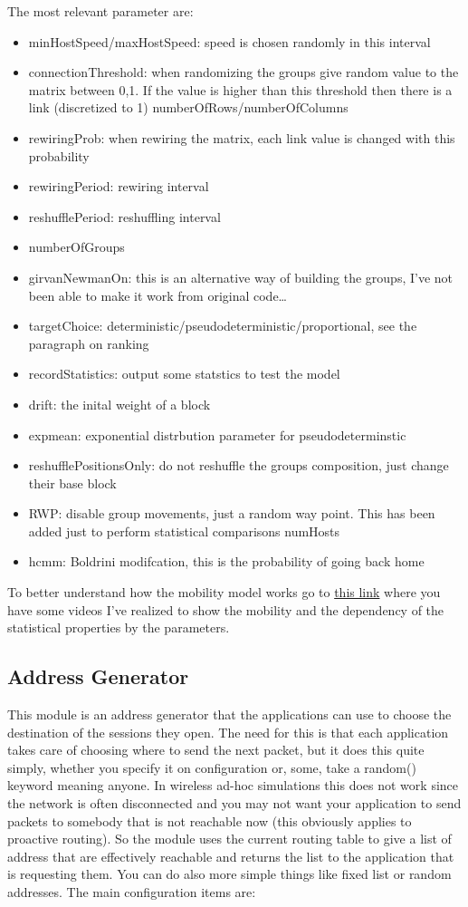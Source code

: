 \documentclass[12pt, a4]{article}
\theoremstyle{definition}
\begin{document}
The most relevant parameter are:
\begin{itemize}
\item    minHostSpeed/maxHostSpeed: speed is chosen randomly in this interval
\item    connectionThreshold: when randomizing the groups give random value to the matrix between 0,1. If the value is higher than this threshold then there is a link (discretized to 1) numberOfRows/numberOfColumns
\item    rewiringProb: when rewiring the matrix, each link value is changed with this probability
\item    rewiringPeriod: rewiring interval
\item    reshufflePeriod: reshuffling interval
\item    numberOfGroups
\item    girvanNewmanOn: this is an alternative way of building the groups, I’ve not been able to make it work from original code…
\item    targetChoice: deterministic/pseudodeterministic/proportional, see the paragraph on ranking
\item    recordStatistics: output some statstics to test the model
\item    drift: the inital weight of a block
\item    expmean: exponential distrbution parameter for pseudodeterminstic
\item    reshufflePositionsOnly: do not reshuffle the groups composition, just change their base block
\item    RWP:  disable group movements, just a random way point. This has been added just to perform statistical comparisons numHosts
\item    hcmm: Boldrini modifcation, this is the probability of going back home
\end{itemize}


To better understand how the mobility model works go to
\href{http://pervacy.eu/?p=78}{this link} where you have some videos I've
realized to show the mobility and the dependency of the statistical properties
by the parameters.

\subsection{Address Generator}
This module is an address generator that the applications can use to choose
the destination of the sessions they open. The need for this is that each
application takes care of choosing where to send the next packet, but it does
this quite simply, whether you specify it on configuration or, some, take a
random() keyword meaning anyone. In wireless ad-hoc simulations this does not
work since the network is often disconnected and you may not want your
application to send packets to somebody that is not reachable now (this
obviously applies to proactive routing). So the module uses the current routing
table to give a list of address that are effectively reachable and returns the
list to the application that is requesting them. You can do also more simple
things like fixed list or random addresses.  The main configuration items are:
\end{document}
